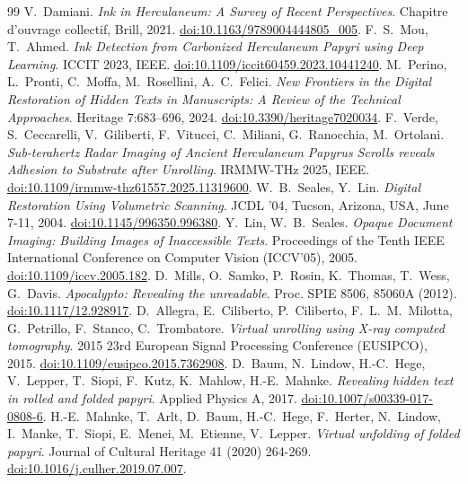 \documentclass[11pt,a4paper]{article}
\begin{document}
\begin{thebibliography}{99}
 V.~Damiani. \emph{Ink in Herculaneum: A Survey of Recent Perspectives}. Chapitre d'ouvrage collectif, Brill, 2021. \href{https://doi.org/10.1163/9789004444805_005}{doi:10.1163/9789004444805\_005}.
 F.~S.~Mou, T.~Ahmed. \emph{Ink Detection from Carbonized Herculaneum Papyri using Deep Learning}. ICCIT 2023, IEEE. \href{https://doi.org/10.1109/iccit60459.2023.10441240}{doi:10.1109/iccit60459.2023.10441240}.
 M.~Perino, L.~Pronti, C.~Moffa, M.~Rosellini, A.~C.~Felici. \emph{New Frontiers in the Digital Restoration of Hidden Texts in Manuscripts: A Review of the Technical Approaches}. Heritage 7:683–696, 2024. \href{https://doi.org/10.3390/heritage7020034}{doi:10.3390/heritage7020034}.
 F.~Verde, S.~Ceccarelli, V.~Giliberti, F.~Vitucci, C.~Miliani, G.~Ranocchia, M.~Ortolani. \emph{Sub-terahertz Radar Imaging of Ancient Herculaneum Papyrus Scrolls reveals Adhesion to Substrate after Unrolling}. IRMMW-THz 2025, IEEE. \href{https://doi.org/10.1109/irmmw-thz61557.2025.11319600}{doi:10.1109/irmmw-thz61557.2025.11319600}.
 W.~B.~Seales, Y.~Lin. \emph{Digital Restoration Using Volumetric Scanning}. JCDL '04, Tucson, Arizona, USA, June 7-11, 2004. \href{https://doi.org/10.1145/996350.996380}{doi:10.1145/996350.996380}.
 Y.~Lin, W.~B.~Seales. \emph{Opaque Document Imaging: Building Images of Inaccessible Texts}. Proceedings of the Tenth IEEE International Conference on Computer Vision (ICCV'05), 2005. \href{https://doi.org/10.1109/iccv.2005.182}{doi:10.1109/iccv.2005.182}.
 D.~Mills, O.~Samko, P.~Rosin, K.~Thomas, T.~Wess, G.~Davis. \emph{Apocalypto: Revealing the unreadable}. Proc. SPIE 8506, 85060A (2012). \href{https://doi.org/10.1117/12.928917}{doi:10.1117/12.928917}.
 D.~Allegra, E.~Ciliberto, P.~Ciliberto, F.~L.~M.~Milotta, G.~Petrillo, F.~Stanco, C.~Trombatore. \emph{Virtual unrolling using X-ray computed tomography}. 2015 23rd European Signal Processing Conference (EUSIPCO), 2015. \href{https://doi.org/10.1109/eusipco.2015.7362908}{doi:10.1109/eusipco.2015.7362908}.
 D.~Baum, N.~Lindow, H.-C.~Hege, V.~Lepper, T.~Siopi, F.~Kutz, K.~Mahlow, H.-E.~Mahnke. \emph{Revealing hidden text in rolled and folded papyri}. Applied Physics A, 2017. \href{https://doi.org/10.1007/s00339-017-0808-6}{doi:10.1007/s00339-017-0808-6}.
 H.-E.~Mahnke, T.~Arlt, D.~Baum, H.-C.~Hege, F.~Herter, N.~Lindow, I.~Manke, T.~Siopi, E.~Menei, M.~Etienne, V.~Lepper. \emph{Virtual unfolding of folded papyri}. Journal of Cultural Heritage 41 (2020) 264-269. \href{https://doi.org/10.1016/j.culher.2019.07.007}{doi:10.1016/j.culher.2019.07.007}.

\end{thebibliography}
\end{document}
